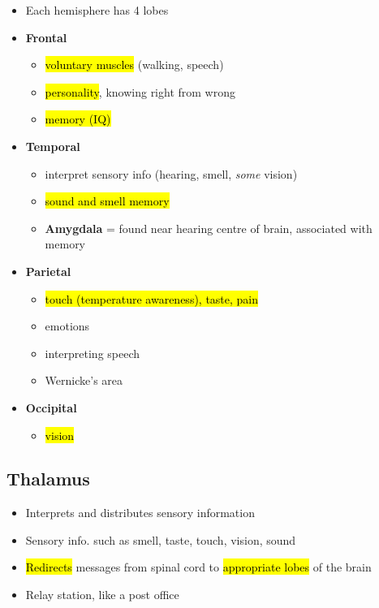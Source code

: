 \documentclass[a4paper,12pt]{article}
\begin{document}
\begin{itemize}
    \item{Each hemisphere has 4 lobes}
    \item{
            \textbf{Frontal}
            \begin{itemize}
                \item{\hl{voluntary muscles} (walking, speech)}
                \item{\hl{personality}, knowing right from wrong}
                \item{\hl{memory (IQ)}}
            \end{itemize}
        }
    \item{
            \textbf{Temporal}
            \begin{itemize}
                \item{interpret sensory info (hearing, smell, \emph{some} vision)}
                \item{\hl{sound and smell memory}}
                \item{\textbf{Amygdala} = found near hearing centre of brain, associated with memory}
            \end{itemize}
        }
    \item{
            \textbf{Parietal}
            \begin{itemize}
                \item{\hl{touch (temperature awareness), taste, pain}}
                \item{emotions}
                \item{interpreting speech}
                \item{Wernicke's area}
            \end{itemize}
        }
    \item{
            \textbf{Occipital}
            \begin{itemize}
                \item{\hl{vision}}
            \end{itemize}
        }
\end{itemize}

\subsection{Thalamus}
\begin{itemize}
    \item{Interprets and distributes sensory information}
    \item{Sensory info. such as smell, taste, touch, vision, sound}
    \item{\hl{Redirects} messages from spinal cord to \hl{appropriate lobes} of the brain}
    \item{Relay station, like a post office}
\end{itemize}
\end{document}
